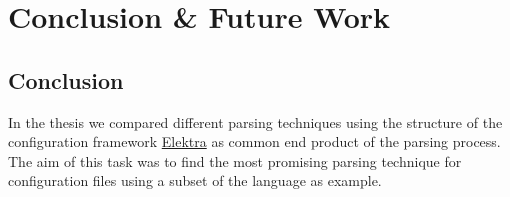\chapter{Conclusion \& Future Work}

%
%
%
%
%
%
%
%
%
%

\section{Conclusion}

In the thesis we compared different parsing techniques using the  structure of the configuration framework \href{https://www.libelektra.org}{Elektra} as common end product of the parsing process. The aim of this task was to find the most promising parsing technique for configuration files using a subset of the language  as example.

